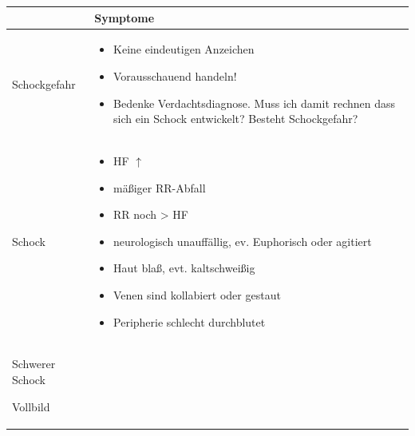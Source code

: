 \documentclass{article}
\begin{document}
\begin{center}
\begin{tabular}{|m{3.9750001cm}m{9.325cm}|}
\hline
 &
\centering Symptome\par

\\\hline
\centering \index{Schockgefahr}Schockgefahr\par

\centering [263A?]\par

 &
\begin{itemize}
\item Keine eindeutigen Anzeichen

\item Vorausschauend handeln!

\item Bedenke Verdachtsdiagnose.  Muss ich damit rechnen dass sich ein
Schock entwickelt?  Besteht Schockgefahr?

\end{itemize}
\\\hline
\centering Schock\par

\centering [E426?]\par

 &
\begin{itemize}
\item HF ${\uparrow}$

\item m\"a{\ss}iger RR-Abfall

\item RR noch {\textgreater} HF

\item neurologisch unauff\"allig, ev. Euphorisch oder agitiert

\item Haut bla{\ss}, evt. kaltschwei{\ss}ig

\item Venen sind kollabiert oder gestaut

\item Peripherie schlecht durchblutet

\end{itemize}
\\\hline
\centering Schwerer Schock\par

\centering Vollbild\par

\centering [E427?]\par


\end{tabular}
\end{center}
\end{document}
